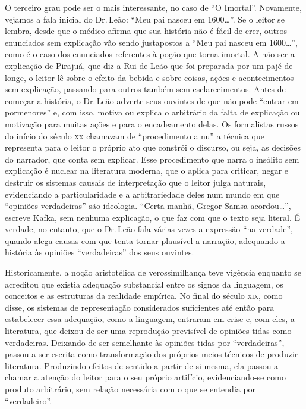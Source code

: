 O terceiro grau pode ser o mais interessante, no caso de ``O Imortal''.
Novamente, vejamos a fala inicial do Dr.\,Leão: ``Meu pai nasceu em
1600\ldots{}''. Se o leitor se lembra, desde que o médico afirma que sua
história não é fácil de crer, outros enunciados sem explicação vão sendo
justapostos a ``Meu pai nasceu em 1600\ldots{}'', como é o caso dos enunciados
referentes à poção que torna imortal. A não ser a explicação de Pirajuá,
que diz a Rui de Leão que foi preparada por um pajé de longe, o leitor
lê sobre o efeito da bebida e sobre coisas, ações e acontecimentos sem
explicação, passando para outros também sem esclarecimentos. Antes de
começar a história, o Dr.\,Leão adverte seus ouvintes de que não pode
``entrar em pormenores'' e, com isso, motiva ou explica o arbitrário da
falta de explicação ou motivação para muitas ações e para o encadeamento
delas. Os formalistas russos do início do século \textsc{xx} chamavam de
``procedimento a nu'' a técnica que representa para o leitor o próprio ato
que constrói o discurso, ou seja, as decisões do narrador, que conta sem
explicar. Esse procedimento que narra o insólito sem explicação é
nuclear na literatura moderna, que o aplica para criticar, negar e
destruir os sistemas causais de interpretação que o leitor julga
naturais, evidenciando a particularidade e a arbitrariedade deles num
mundo em que ``opiniões verdadeiras'' são ideologia. ``Certa manhã, Gregor
Samsa acordou\ldots{}'', escreve Kafka, sem nenhuma explicação, o que faz com
que o texto seja literal. É verdade, no entanto, que o Dr.\,Leão fala
várias vezes a expressão ``na verdade'', quando alega causas com que tenta
tornar plausível a narração, adequando a história às opiniões
``verdadeiras'' dos seus ouvintes.

Historicamente, a noção aristotélica de verossimilhança teve vigência
enquanto se acreditou que existia adequação substancial entre os signos
da linguagem, os conceitos e as estruturas da realidade empírica. No
final do século \textsc{xix}, como disse, os sistemas de representação
considerados suficientes até então para estabelecer essa adequação, como
a linguagem, entraram em crise e, com eles, a literatura, que deixou de
ser uma reprodução previsível de opiniões tidas como verdadeiras.
Deixando de ser semelhante às opiniões tidas por ``verdadeiras'', passou a
ser escrita como transformação dos próprios meios técnicos de produzir
literatura. Produzindo efeitos de sentido a partir de si mesma, ela
passou a chamar a atenção do leitor para o seu próprio artifício,
evidenciando-se como produto arbitrário, sem relação necessária com o
que se entendia por ``verdadeiro''.

